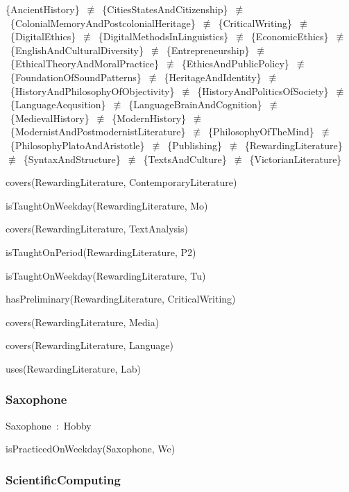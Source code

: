 \documentclass{article}
\begin{document}
\{AncientHistory\}~\ensuremath{\not\equiv}~\{CitiesStatesAndCitizenship\}~\ensuremath{\not\equiv}~\{ColonialMemoryAndPostcolonialHeritage\}~\ensuremath{\not\equiv}~\{CriticalWriting\}~\ensuremath{\not\equiv}~\{DigitalEthics\}~\ensuremath{\not\equiv}~\{DigitalMethodsInLinguistics\}~\ensuremath{\not\equiv}~\{EconomicEthics\}~\ensuremath{\not\equiv}~\{EnglishAndCulturalDiversity\}~\ensuremath{\not\equiv}~\{Entrepreneurship\}~\ensuremath{\not\equiv}~\{EthicalTheoryAndMoralPractice\}~\ensuremath{\not\equiv}~\{EthicsAndPublicPolicy\}~\ensuremath{\not\equiv}~\{FoundationOfSoundPatterns\}~\ensuremath{\not\equiv}~\{HeritageAndIdentity\}~\ensuremath{\not\equiv}~\{HistoryAndPhilosophyOfObjectivity\}~\ensuremath{\not\equiv}~\{HistoryAndPoliticsOfSociety\}~\ensuremath{\not\equiv}~\{LanguageAcqusition\}~\ensuremath{\not\equiv}~\{LanguageBrainAndCognition\}~\ensuremath{\not\equiv}~\{MedievalHistory\}~\ensuremath{\not\equiv}~\{ModernHistory\}~\ensuremath{\not\equiv}~\{ModernistAndPostmodernistLiterature\}~\ensuremath{\not\equiv}~\{PhilosophyOfTheMind\}~\ensuremath{\not\equiv}~\{PhilosophyPlatoAndAristotle\}~\ensuremath{\not\equiv}~\{Publishing\}~\ensuremath{\not\equiv}~\{RewardingLiterature\}~\ensuremath{\not\equiv}~\{SyntaxAndStructure\}~\ensuremath{\not\equiv}~\{TextsAndCulture\}~\ensuremath{\not\equiv}~\{VictorianLiterature\}

covers(RewardingLiterature, ContemporaryLiterature)

isTaughtOnWeekday(RewardingLiterature, Mo)

covers(RewardingLiterature, TextAnalysis)

isTaughtOnPeriod(RewardingLiterature, P2)

isTaughtOnWeekday(RewardingLiterature, Tu)

hasPreliminary(RewardingLiterature, CriticalWriting)

covers(RewardingLiterature, Media)

covers(RewardingLiterature, Language)

uses(RewardingLiterature, Lab)

\subsubsection*{Saxophone}

Saxophone~:~Hobby

isPracticedOnWeekday(Saxophone, We)

\subsubsection*{ScientificComputing}
\end{document}
